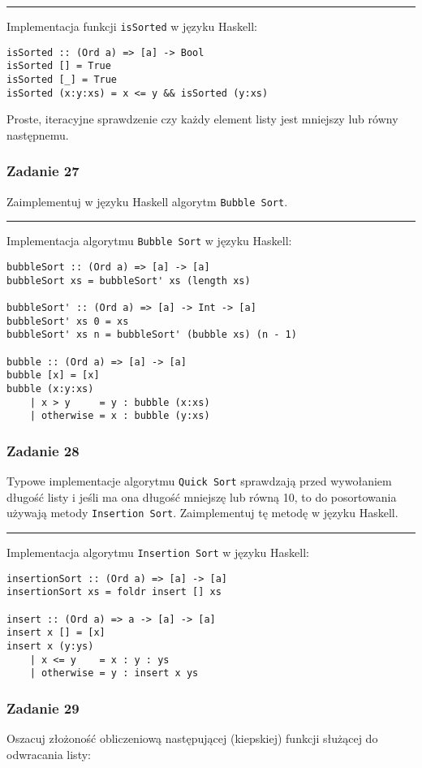 \documentclass[11pt,a4paper]{article}
\begin{document}
\bigskip
\hrule
\bigskip

Implementacja funkcji \texttt{isSorted} w języku Haskell:
\begin{Verbatim}[frame=single]
isSorted :: (Ord a) => [a] -> Bool
isSorted [] = True
isSorted [_] = True
isSorted (x:y:xs) = x <= y && isSorted (y:xs)
\end{Verbatim}
Proste, iteracyjne sprawdzenie czy każdy element listy jest mniejszy lub równy następnemu.

\subsubsection{Zadanie 27}
Zaimplementuj w języku Haskell algorytm \texttt{Bubble Sort}.

\bigskip
\hrule
\bigskip

Implementacja algorytmu \texttt{Bubble Sort} w języku Haskell:
\begin{Verbatim}[frame=single]
bubbleSort :: (Ord a) => [a] -> [a]
bubbleSort xs = bubbleSort' xs (length xs)

bubbleSort' :: (Ord a) => [a] -> Int -> [a]
bubbleSort' xs 0 = xs
bubbleSort' xs n = bubbleSort' (bubble xs) (n - 1)

bubble :: (Ord a) => [a] -> [a]
bubble [x] = [x]
bubble (x:y:xs)
    | x > y     = y : bubble (x:xs)
    | otherwise = x : bubble (y:xs)
\end{Verbatim}

\subsubsection{Zadanie 28}
Typowe implementacje algorytmu \texttt{Quick Sort} sprawdzają przed wywołaniem długość listy i jeśli ma ona długość mniejszę lub równą 10, to do posortowania używają metody \texttt{Insertion Sort}. Zaimplementuj tę metodę w języku Haskell.

\bigskip
\hrule
\bigskip

Implementacja algorytmu \texttt{Insertion Sort} w języku Haskell:
\begin{Verbatim}[frame=single]
insertionSort :: (Ord a) => [a] -> [a]
insertionSort xs = foldr insert [] xs

insert :: (Ord a) => a -> [a] -> [a]
insert x [] = [x]
insert x (y:ys)
    | x <= y    = x : y : ys
    | otherwise = y : insert x ys
\end{Verbatim}

\subsubsection{Zadanie 29} \label{subsec:zad29}
Oszacuj złożoność obliczeniową następującej (kiepskiej) funkcji służącej do odwracania listy:
\end{document}
